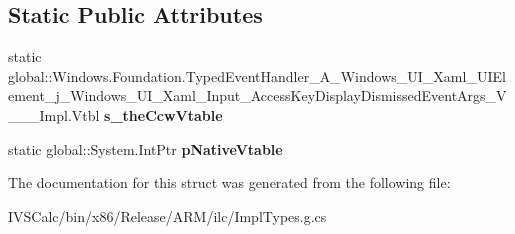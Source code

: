 \subsection*{Static Public Attributes}
\begin{DoxyCompactItemize}
\item 
\mbox{\label{struct_windows_1_1_foundation_1_1_typed_event_handler___a___windows___u_i___xaml___u_i_element__d3bbe6abc1f0f1df72766f3122d9fe94_a32374875cc5ddcb592dcbefc17fd150c}} 
static global\+::\+Windows.\+Foundation.\+Typed\+Event\+Handler\+\_\+\+A\+\_\+\+Windows\+\_\+\+U\+I\+\_\+\+Xaml\+\_\+\+U\+I\+Element\+\_\+j\+\_\+\+Windows\+\_\+\+U\+I\+\_\+\+Xaml\+\_\+\+Input\+\_\+\+Access\+Key\+Display\+Dismissed\+Event\+Args\+\_\+\+V\+\_\+\+\_\+\+\_\+\+Impl.\+Vtbl {\bfseries s\+\_\+the\+Ccw\+Vtable}
\item 
\mbox{\label{struct_windows_1_1_foundation_1_1_typed_event_handler___a___windows___u_i___xaml___u_i_element__d3bbe6abc1f0f1df72766f3122d9fe94_aa17803aaa3b7660f82e05831d8f422fd}} 
static global\+::\+System.\+Int\+Ptr {\bfseries p\+Native\+Vtable}
\end{DoxyCompactItemize}


The documentation for this struct was generated from the following file\+:\begin{DoxyCompactItemize}
\item 
I\+V\+S\+Calc/bin/x86/\+Release/\+A\+R\+M/ilc/Impl\+Types.\+g.\+cs\end{DoxyCompactItemize}
